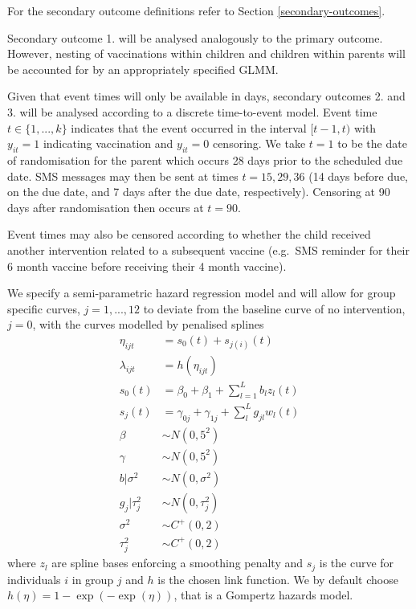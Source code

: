\documentclass[
  bibliography=totoc]{scrreprt}
\begin{document}
For the secondary outcome definitions refer to Section \ref{secondary-outcomes}.

Secondary outcome 1. will be analysed analogously to the primary outcome.
However, nesting of vaccinations within children and children within parents will be accounted for by an appropriately specified GLMM.

Given that event times will only be available in days, secondary outcomes 2. and 3. will be analysed according to a discrete time-to-event model.
Event time \(t\in\{1,...,k\}\) indicates that the event occurred in the interval \([t-1, t)\) with \(y_{it}=1\) indicating vaccination and \(y_{it}=0\) censoring.
We take \(t=1\) to be the date of randomisation for the parent which occurs 28 days prior to the scheduled due date.
SMS messages may then be sent at times \(t=15, 29, 36\) (14 days before due, on the due date, and 7 days after the due date, respectively).
Censoring at 90 days after randomisation then occurs at \(t=90\).

Event times may also be censored according to whether the child received another intervention related to a subsequent vaccine (e.g.~SMS reminder for their 6 month vaccine before receiving their 4 month vaccine).

We specify a semi-parametric hazard regression model and will allow for group specific curves, \(j=1,...,12\) to deviate from the baseline curve of no intervention, \(j=0\), with the curves modelled by penalised splines \citep{eilers1996, currie2002, wand2008}
\[
\begin{aligned}
\eta_{ijt} &= s_0(t) + s_{j(i)}(t) \\
\lambda_{ijt} &= h(\eta_{ijt}) \\
s_0(t) &= \beta_0 + \beta_1 + \textstyle\sum_{l=1}^L b_l z_l(t) \\
s_j(t) &= \gamma_{0j} + \gamma_{1j} + \textstyle\sum_l^L g_{jl} w_l(t) \\
\beta &\sim N(0,5^2) \\
\gamma &\sim N(0,5^2) \\
b|\sigma^2 &\sim N(0,\sigma^2)\\
g_j|\tau_j^2 &\sim N(0, \tau_j^2)\\
\sigma^2 &\sim C^+(0, 2) \\
\tau_j^2 &\sim C^+(0, 2)
\end{aligned}
\]
where \(z_l\) are spline bases enforcing a smoothing penalty and \(s_j\) is the curve for individuals \(i\) in group \(j\) and \(h\) is the chosen link function.
We by default choose \(h(\eta) = 1 - \exp(-\exp(\eta))\), that is a Gompertz hazards model.
\end{document}

